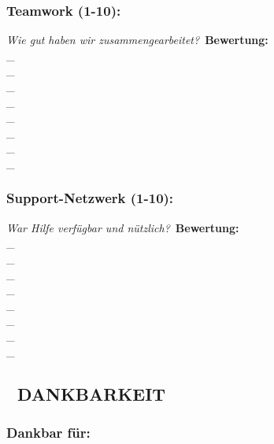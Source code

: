 \subsubsection{\textbf{Teamwork (1-10):}}

\textit{\textcolor{ctmmYellow}{\faLightbulb} Wie gut haben wir zusammengearbeitet?}\
\textbf{Bewertung:} \\\_\\\_\\\_\\\_\\\_\\\_\\\_\\\_

\subsubsection{\textbf{Support-Netzwerk (1-10):}}

\textit{\textcolor{ctmmYellow}{\faLightbulb} War Hilfe verfügbar und nützlich?}\
\textbf{Bewertung:} \\\_\\\_\\\_\\\_\\\_\\\_\\\_\\\_

\subsection{\textbf{💝 DANKBARKEIT}}

\subsubsection{\textbf{Dankbar für:}}

